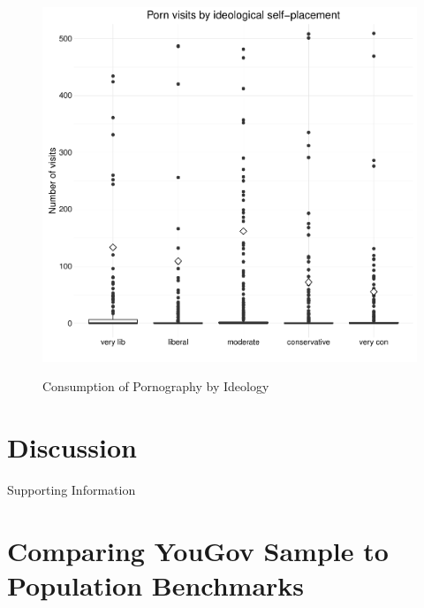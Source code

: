 \documentclass[12pt, letterpaper]{article}
\begin{document}
\begin{figure}[h]
\centering
\caption{Consumption of Pornography by Ideology}
\includegraphics[scale=.75]{../figs/ideo_boxplot_shalla.pdf}
\label{fig:summary}
\end{figure}

\section*{Discussion}

\clearpage


\clearpage
\appendix
\renewcommand{\thesection}{SI \arabic{section}}
\renewcommand\thetable{\thesection.\arabic{table}}  
\renewcommand\thefigure{\thesection.\arabic{figure}}

\begin{center}
\Large{Supporting Information}
\end{center}

\clearpage
\section{Comparing YouGov Sample to Population Benchmarks}
\label{si2_yougov}


\end{document}
